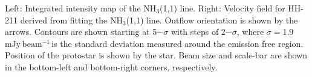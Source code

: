 \label{Fig1:HH211}
{Left:} Integrated intensity map of the NH$_3$(1,1) line. 
{Right:} Velocity field for HH-211 derived from fitting the NH$_3$(1,1) line.
Outflow orientation is shown by the arrows. 
Contours are shown starting at 5$-\sigma$ with steps of 
2$-\sigma$, where $\sigma=$1.9\,mJy\,beam$^{-1}$\,\kms is the standard deviation measured 
around the emission free region.
Position of the protostar is shown by the star. 
Beam size and scale-bar are shown in the bottom-left and bottom-right corners, respectively.